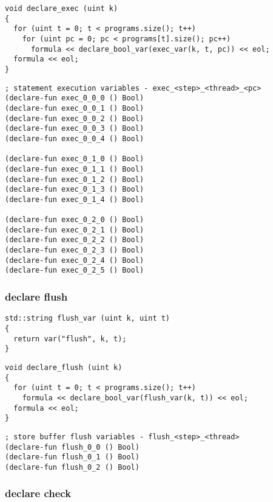 \begin{lstlisting}[style=c++]
void declare_exec (uint k)
{
  for (uint t = 0; t < programs.size(); t++)
    for (uint pc = 0; pc < programs[t].size(); pc++)
      formula << declare_bool_var(exec_var(k, t, pc)) << eol;
  formula << eol;
}
\end{lstlisting}

\begin{lstlisting}[language=SMTLib]
; statement execution variables - exec_<step>_<thread>_<pc>
(declare-fun exec_0_0_0 () Bool)
(declare-fun exec_0_0_1 () Bool)
(declare-fun exec_0_0_2 () Bool)
(declare-fun exec_0_0_3 () Bool)
(declare-fun exec_0_0_4 () Bool)

(declare-fun exec_0_1_0 () Bool)
(declare-fun exec_0_1_1 () Bool)
(declare-fun exec_0_1_2 () Bool)
(declare-fun exec_0_1_3 () Bool)
(declare-fun exec_0_1_4 () Bool)

(declare-fun exec_0_2_0 () Bool)
(declare-fun exec_0_2_1 () Bool)
(declare-fun exec_0_2_2 () Bool)
(declare-fun exec_0_2_3 () Bool)
(declare-fun exec_0_2_4 () Bool)
(declare-fun exec_0_2_5 () Bool)
\end{lstlisting}

\subsubsection{declare flush}

\begin{lstlisting}[style=c++]
std::string flush_var (uint k, uint t)
{
  return var("flush", k, t);
}
\end{lstlisting}

\begin{lstlisting}[style=c++]
void declare_flush (uint k)
{
  for (uint t = 0; t < programs.size(); t++)
    formula << declare_bool_var(flush_var(k, t)) << eol;
  formula << eol;
}
\end{lstlisting}

\begin{lstlisting}[language=SMTLib]
; store buffer flush variables - flush_<step>_<thread>
(declare-fun flush_0_0 () Bool)
(declare-fun flush_0_1 () Bool)
(declare-fun flush_0_2 () Bool)
\end{lstlisting}

\subsubsection{declare check}

